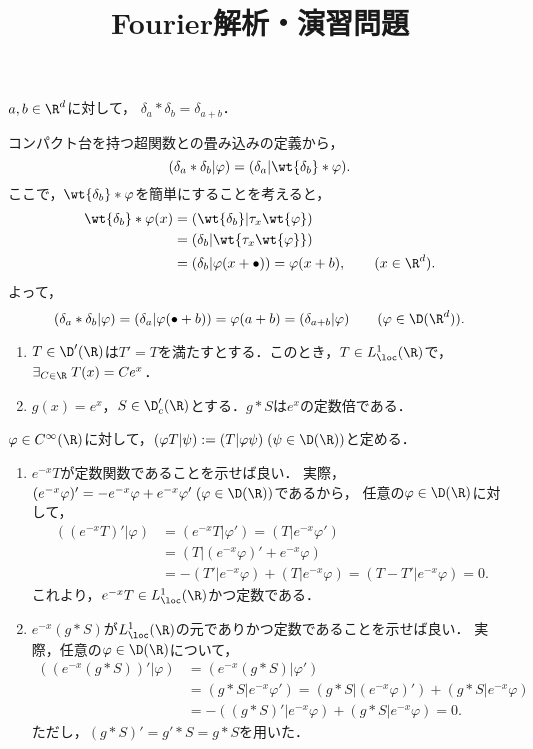 \documentclass[uplatex,dvipdfmx]{jsarticle}
\title{Fourier解析・演習問題}
\author{}
\begin{document}
\begin{example}
    $a,b\in\R^d$に対して，
    $\delta_a*\delta_b=\delta_{a+b}$．
\end{example}
\begin{Proof}
    コンパクト台を持つ超関数との畳み込みの定義から，
    \[(\delta_a*\delta_b|\varphi)=(\delta_a|\wt{\delta_b}*\varphi).\]
    ここで，$\wt{\delta_b}*\varphi$を簡単にすることを考えると，
    \begin{align*}
        \wt{\delta_b}*\varphi(x)&=(\wt{\delta_b}|\tau_x\wt{\varphi})\\
        &=(\delta_b|\wt{\tau_x\wt{\varphi}})\\
        &=(\delta_b|\varphi(x+\bullet))=\varphi(x+b),\qquad(x\in\R^d).
    \end{align*}
    よって，
    \[(\delta_a*\delta_b|\varphi)=(\delta_a|\varphi(\bullet+b))=\varphi(a+b)=(\delta_{a+b}|\varphi)\qquad(\varphi\in\D(\R^d)).\]
\end{Proof}

\begin{proposition}\mbox{}
    \begin{enumerate}
        \item $T\in\D'(\R)$は$T'=T$を満たすとする．このとき，$T\in L^1_\loc(\R)$で，$\exists_{C\in\R}\;T(x)=Ce^x$．
        \item $g(x)=e^x$，$S\in\D'_c(\R)$とする．$g*S$は$e^x$の定数倍である．
    \end{enumerate}
\end{proposition}
\begin{Proof}
    $\varphi\in C^\infty(\R)$に対して，$(\varphi T|\psi):=(T|\varphi\psi)\;(\psi\in\D(\R))$と定める．
    \begin{enumerate}
        \item $e^{-x}T$が定数関数であることを示せば良い．
        実際，$(e^{-x}\varphi)'=-e^{-x}\varphi+e^{-x}\varphi'\;(\varphi\in\D(\R))$であるから，
        任意の$\varphi\in \D(\R)$に対して，
        \begin{align*}
            ((e^{-x}T)'|\varphi)&=(e^{-x}T|\varphi')=(T|e^{-x}\varphi')\\
            &=(T|(e^{-x}\varphi)'+e^{-x}\varphi)\\
            &=-(T'|e^{-x}\varphi)+(T|e^{-x}\varphi)=(T-T'|e^{-x}\varphi)=0.
        \end{align*}
        これより，$e^{-x}T\in L^1_\loc(\R)$かつ定数である．
        \item $e^{-x}(g*S)$が$L^1_\loc(\R)$の元でありかつ定数であることを示せば良い．
        実際，任意の$\varphi\in\D(\R)$について，
        \begin{align*}
            ((e^{-x}(g*S))'|\varphi)&=(e^{-x}(g*S)|\varphi')\\
            &=(g*S|e^{-x}\varphi')=(g*S|(e^{-x}\varphi)')+(g*S|e^{-x}\varphi)\\
            &=-((g*S)'|e^{-x}\varphi)+(g*S|e^{-x}\varphi)=0.
        \end{align*}
        ただし，$(g*S)'=g'*S=g*S$を用いた．
    \end{enumerate}
\end{Proof}
\end{document}
